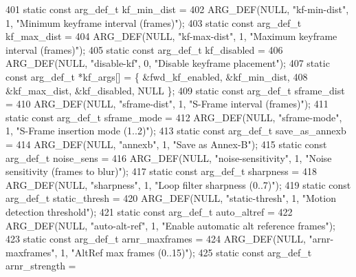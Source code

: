 \begin{DoxyCodeInclude}
{{{{{{{401 \textcolor{keyword}{static} \textcolor{keyword}{const} arg\_def\_t kf\_min\_dist =
402     ARG\_DEF(NULL, \textcolor{stringliteral}{"kf-min-dist"}, 1, \textcolor{stringliteral}{"Minimum keyframe interval (frames)"});
403 \textcolor{keyword}{static} \textcolor{keyword}{const} arg\_def\_t kf\_max\_dist =
404     ARG\_DEF(NULL, \textcolor{stringliteral}{"kf-max-dist"}, 1, \textcolor{stringliteral}{"Maximum keyframe interval (frames)"});
405 \textcolor{keyword}{static} \textcolor{keyword}{const} arg\_def\_t kf\_disabled =
406     ARG\_DEF(NULL, \textcolor{stringliteral}{"disable-kf"}, 0, \textcolor{stringliteral}{"Disable keyframe placement"});
407 \textcolor{keyword}{static} \textcolor{keyword}{const} arg\_def\_t *kf\_args[] = \{ &fwd\_kf\_enabled, &kf\_min\_dist,
408     &kf\_max\_dist, &kf\_disabled, NULL \};
409 \textcolor{keyword}{static} \textcolor{keyword}{const} arg\_def\_t sframe\_dist =
410     ARG\_DEF(NULL, \textcolor{stringliteral}{"sframe-dist"}, 1, \textcolor{stringliteral}{"S-Frame interval (frames)"});
411 \textcolor{keyword}{static} \textcolor{keyword}{const} arg\_def\_t sframe\_mode =
412     ARG\_DEF(NULL, \textcolor{stringliteral}{"sframe-mode"}, 1, \textcolor{stringliteral}{"S-Frame insertion mode (1..2)"});
413 \textcolor{keyword}{static} \textcolor{keyword}{const} arg\_def\_t save\_as\_annexb =
414     ARG\_DEF(NULL, \textcolor{stringliteral}{"annexb"}, 1, \textcolor{stringliteral}{"Save as Annex-B"});
415 \textcolor{keyword}{static} \textcolor{keyword}{const} arg\_def\_t noise\_sens =
416     ARG\_DEF(NULL, \textcolor{stringliteral}{"noise-sensitivity"}, 1, \textcolor{stringliteral}{"Noise sensitivity (frames to blur)"});
417 \textcolor{keyword}{static} \textcolor{keyword}{const} arg\_def\_t sharpness =
418     ARG\_DEF(NULL, \textcolor{stringliteral}{"sharpness"}, 1, \textcolor{stringliteral}{"Loop filter sharpness (0..7)"});
419 \textcolor{keyword}{static} \textcolor{keyword}{const} arg\_def\_t static\_thresh =
420     ARG\_DEF(NULL, \textcolor{stringliteral}{"static-thresh"}, 1, \textcolor{stringliteral}{"Motion detection threshold"});
421 \textcolor{keyword}{static} \textcolor{keyword}{const} arg\_def\_t auto\_altref =
422     ARG\_DEF(NULL, \textcolor{stringliteral}{"auto-alt-ref"}, 1, \textcolor{stringliteral}{"Enable automatic alt reference frames"});
423 \textcolor{keyword}{static} \textcolor{keyword}{const} arg\_def\_t arnr\_maxframes =
424     ARG\_DEF(NULL, \textcolor{stringliteral}{"arnr-maxframes"}, 1, \textcolor{stringliteral}{"AltRef max frames (0..15)"});
425 \textcolor{keyword}{static} \textcolor{keyword}{const} arg\_def\_t arnr\_strength =
}}}}}}}
\end{DoxyCodeInclude}
